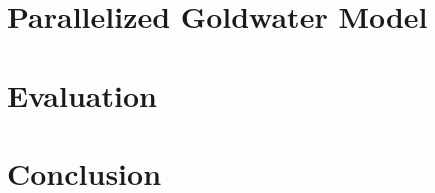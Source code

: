 \documentclass{article}
\begin{document}


\section{Parallelized Goldwater Model}
\label{sec:parallel-goldwater}



\section{Evaluation}
\label{sec:evaluation}



\section{Conclusion}
\label{sec:conclusion}





\end{document}
